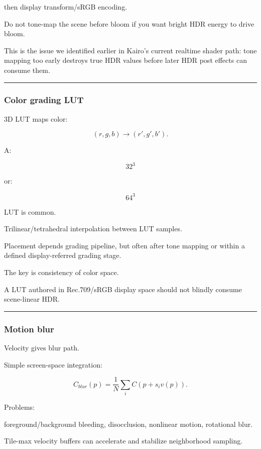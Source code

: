 then display transform/sRGB encoding.

Do not tone-map the scene before bloom if you want bright HDR energy to drive bloom.

This is the issue we identified earlier in Kairo's current realtime shader path: tone mapping too early destroys true HDR values before later HDR post effects can consume them.

\begin{center}\rule{0.5\linewidth}{0.5pt}\end{center}

\subsubsection{Color grading LUT}\label{color-grading-lut}

3D LUT maps color:

\[
(r,g,b)
\rightarrow
(r',g',b').
\]

A:

\[
32^3
\]

or:

\[
64^3
\]

LUT is common.

Trilinear/tetrahedral interpolation between LUT samples.

Placement depends grading pipeline, but often after tone mapping or within a defined display-referred grading stage.

The key is consistency of color space.

A LUT authored in Rec.709/sRGB display space should not blindly consume scene-linear HDR.

\begin{center}\rule{0.5\linewidth}{0.5pt}\end{center}

\subsubsection{Motion blur}\label{motion-blur}

Velocity gives blur path.

Simple screen-space integration:

\[
C_{blur}(p)
=
\frac1N
\sum_i
C(
p+s_iv(p)
).
\]

Problems:

foreground/background bleeding, disocclusion, nonlinear motion, rotational blur.

Tile-max velocity buffers can accelerate and stabilize neighborhood sampling.

